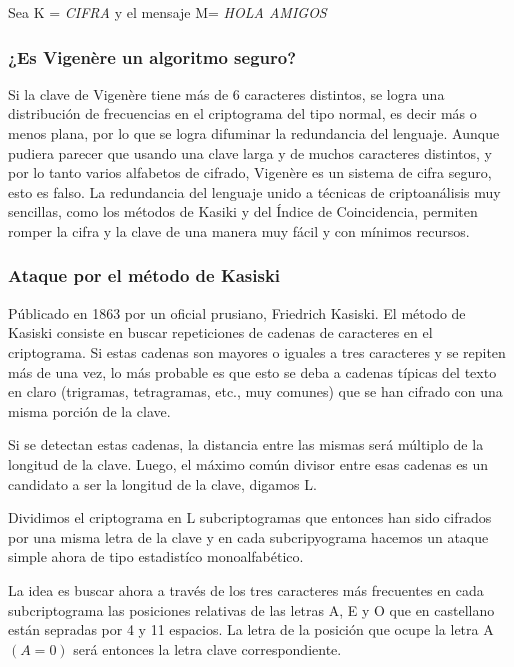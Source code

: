 \documentclass{article}
\begin{document}
Sea K = \emph{CIFRA} y el mensaje M= \emph{HOLA AMIGOS}

%
%
%
%

\subsubsection{¿Es Vigenère un algoritmo seguro?}
\justify
Si la clave de Vigenère tiene más de 6 caracteres distintos, se logra una distribución de frecuencias en el criptograma del tipo normal, es decir más o menos plana, por lo que se logra difuminar la redundancia del lenguaje. 
Aunque pudiera parecer que usando una clave larga y de muchos caracteres distintos, y por lo tanto varios alfabetos de cifrado, Vigenère es un sistema de cifra seguro, esto es falso. 
La redundancia del lenguaje unido a técnicas de criptoanálisis muy sencillas, como los métodos de Kasiki y del Índice de Coincidencia, permiten romper la cifra y la clave de una manera muy fácil y con mínimos recursos. 

\subsubsection{Ataque por el método de Kasiski}
\justify
Públicado en 1863 por un oficial prusiano, Friedrich Kasiski. El método de Kasiski consiste en buscar repeticiones de cadenas de caracteres en el criptograma. Si estas cadenas son mayores o iguales a tres caracteres y se repiten más de una vez, lo más probable es que esto se deba a cadenas típicas del texto en claro (trigramas, tetragramas, etc., muy comunes) que se han cifrado con una misma porción de la clave. 

Si se detectan estas cadenas, la distancia entre las mismas será múltiplo de la longitud de la clave. Luego, el máximo común divisor entre esas cadenas es un candidato a ser la longitud de la clave, digamos L.

Dividimos el criptograma en L subcriptogramas que entonces han sido cifrados por una misma letra de la clave y en cada subcripyograma hacemos un ataque simple ahora de tipo estadistíco monoalfabético. 

La idea es buscar ahora a través de los tres caracteres más frecuentes en cada subcriptograma las posiciones relativas de las letras A, E y O que en castellano están sepradas por 4 y 11 espacios. La letra de la posición que ocupe la letra A $\left(A=0\right)$ será entonces la letra clave correspondiente. 
\justify
\footnotesize
\end{document}
